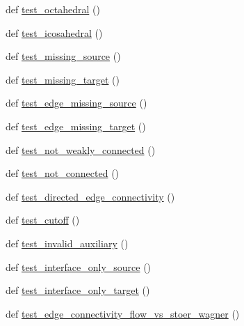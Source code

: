 \begin{DoxyCompactItemize}
def \hyperlink{namespacenetworkx_1_1algorithms_1_1connectivity_1_1tests_1_1test__connectivity_a9aa9ca30510f27cdb0d2994cf9628ae0}{test\+\_\+octahedral} ()
\item 
def \hyperlink{namespacenetworkx_1_1algorithms_1_1connectivity_1_1tests_1_1test__connectivity_afb63f9e722d0e7feac2c858cae11bd07}{test\+\_\+icosahedral} ()
\item 
def \hyperlink{namespacenetworkx_1_1algorithms_1_1connectivity_1_1tests_1_1test__connectivity_af605cdd0b1b65fb2e3513cb46b8ddf1c}{test\+\_\+missing\+\_\+source} ()
\item 
def \hyperlink{namespacenetworkx_1_1algorithms_1_1connectivity_1_1tests_1_1test__connectivity_aaa3f57d7542967aa56c07a5083d9f60a}{test\+\_\+missing\+\_\+target} ()
\item 
def \hyperlink{namespacenetworkx_1_1algorithms_1_1connectivity_1_1tests_1_1test__connectivity_a0e2b5491627fd41310bfe49200bcc717}{test\+\_\+edge\+\_\+missing\+\_\+source} ()
\item 
def \hyperlink{namespacenetworkx_1_1algorithms_1_1connectivity_1_1tests_1_1test__connectivity_a5afe17cfc9ffc7fe973b11b2228a9ded}{test\+\_\+edge\+\_\+missing\+\_\+target} ()
\item 
def \hyperlink{namespacenetworkx_1_1algorithms_1_1connectivity_1_1tests_1_1test__connectivity_a9541cb0d7afbd2e76757307a8835f282}{test\+\_\+not\+\_\+weakly\+\_\+connected} ()
\item 
def \hyperlink{namespacenetworkx_1_1algorithms_1_1connectivity_1_1tests_1_1test__connectivity_a78d8db44c513547f14a28c6a35788a10}{test\+\_\+not\+\_\+connected} ()
\item 
def \hyperlink{namespacenetworkx_1_1algorithms_1_1connectivity_1_1tests_1_1test__connectivity_a52fbb2d8d12bbdde863c732127afbc0c}{test\+\_\+directed\+\_\+edge\+\_\+connectivity} ()
\item 
def \hyperlink{namespacenetworkx_1_1algorithms_1_1connectivity_1_1tests_1_1test__connectivity_a8c01e7ba6199ec1edd4528c37a1de5cb}{test\+\_\+cutoff} ()
\item 
def \hyperlink{namespacenetworkx_1_1algorithms_1_1connectivity_1_1tests_1_1test__connectivity_aef5e8b4bfd61c6c298d640305c776eef}{test\+\_\+invalid\+\_\+auxiliary} ()
\item 
def \hyperlink{namespacenetworkx_1_1algorithms_1_1connectivity_1_1tests_1_1test__connectivity_add66c325870cfd239c6a7591bba3d976}{test\+\_\+interface\+\_\+only\+\_\+source} ()
\item 
def \hyperlink{namespacenetworkx_1_1algorithms_1_1connectivity_1_1tests_1_1test__connectivity_af84340a879b378e35f31a0e14a836387}{test\+\_\+interface\+\_\+only\+\_\+target} ()
\item 
def \hyperlink{namespacenetworkx_1_1algorithms_1_1connectivity_1_1tests_1_1test__connectivity_a9c2d6fe68a97ac568d4d88a7592b604c}{test\+\_\+edge\+\_\+connectivity\+\_\+flow\+\_\+vs\+\_\+stoer\+\_\+wagner} ()
\end{DoxyCompactItemize}
